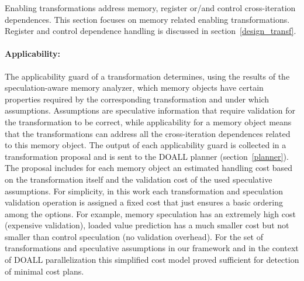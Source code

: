 Enabling transformations address memory, register or/and control
cross-iteration dependences.
%
This section focuses on memory related enabling transformations.
Register and control dependence handling is discussed in
section~\ref{design_transf}.


%
\paragraph{Applicability:}
%
The applicability guard of a transformation determines, using the
results of the speculation-aware memory analyzer,  which memory
objects have certain properties required by the corresponding
transformation and under which assumptions.
%
Assumptions are speculative information that require validation for
the transformation to be correct, while applicability for a memory
object means that the transformations can address all the
cross-iteration dependences related to this memory object.
%
The output of each applicability guard is collected in a
transformation proposal and is sent to the DOALL planner
(section~\ref{planner}).
%
The proposal includes for each memory object an estimated handling
cost based on the transformation itself and the validation cost of the
used speculative assumptions.
%
%
For simplicity, in this work each transformation and speculation
validation operation is assigned a fixed
cost that just ensures a basic ordering among the options. For
example,
memory speculation has an extremely high cost (expensive validation),
loaded value prediction has a much smaller cost but not smaller than
control speculation (no validation overhead).
%
%
For the set of transformations and speculative assumptions in our
framework and in the context of DOALL parallelization this simplified
cost model proved sufficient for detection of minimal cost plans.
%

